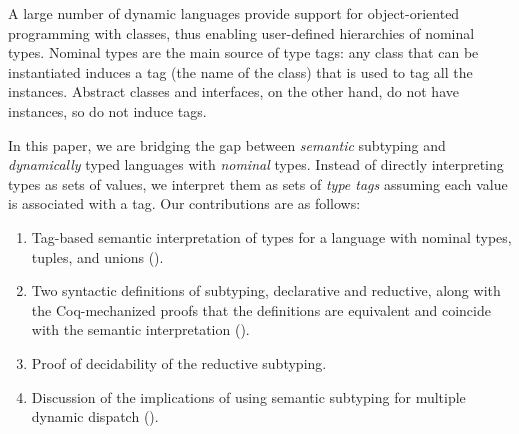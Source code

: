 A large number of dynamic languages provide support 
for object-oriented programming with classes, 
thus enabling user-defined hierarchies of nominal types.
Nominal types are the main source of type tags: 
any class that can be instantiated induces a tag (the name of the class) 
that is used to tag all the instances.
Abstract classes and interfaces, on the other hand, 
do not have instances, so do not induce tags.

In this paper, we are bridging the gap between \emph{semantic} subtyping 
and \emph{dynamically} typed languages with \emph{nominal} types.
Instead of directly interpreting types as sets of values,
we interpret them as sets of \emph{type tags} assuming 
each value is associated with a tag.
Our contributions are as follows:
\begin{enumerate}
  \item Tag-based semantic interpretation of types for a language
    with nominal types, tuples, and unions ().
  \item Two syntactic definitions of subtyping, declarative and reductive,
    along with the Coq-mechanized proofs that the definitions are equivalent
    and coincide with the semantic interpretation (). 	
  \item Proof of decidability of the reductive subtyping.
  \item Discussion of the implications of using semantic subtyping
    for multiple dynamic dispatch ().
\end{enumerate}







